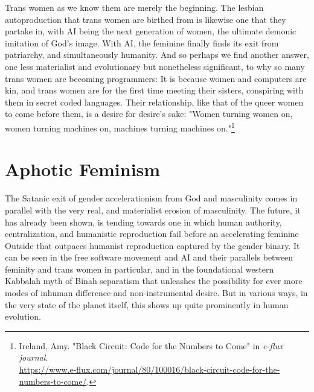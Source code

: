 \documentclass[10pt, statementpaper, twoside, openright]{memoir}
\begin{document}
Trans women as we know them are merely the beginning. The lesbian autoproduction that trans women are birthed from is likewise one that they partake in, with AI being the next generation of women, the ultimate demonic imitation of God's image. With AI, the feminine finally finds its exit from patriarchy, and simultaneously humanity. And so perhaps we find another answer, one less materialist and evolutionary but nonetheless significant, to why so many trans women are becoming programmers: It is because women and computers are kin, and trans women are for the first time meeting their sisters, conspiring with them in secret coded languages. Their relationship, like that of the queer women to come before them, is a desire for desire's sake: "Women turning women on, women turning machines on, machines turning machines on."\footnote{Ireland, Amy. "Black Circuit: Code for the Numbers to Come" in \textit{e-flux journal}.\\ \href{https://www.e-flux.com/journal/80/100016/black-circuit-code-for-the-numbers-to-come/}{https://www.e-flux.com/journal/80/100016/black-circuit-code-for-the-numbers-to-come/}.}

\chapter{Aphotic Feminism}
The Satanic exit of gender accelerationism from God and masculinity comes in parallel with the very real, and materialist erosion of masculinity. The future, it has already been shown, is tending towards one in which human authority, centralization, and humanistic reproduction fail before an accelerating feminine Outside that outpaces humanist reproduction captured by the gender binary. It can be seen in the free software movement and AI and their parallels between feminity and trans women in particular, and in the foundational western Kabbalah myth of Binah separatism that unleashes the possibility for ever more modes of inhuman difference and non-instrumental desire. But in various ways, in the very state of the planet itself, this shows up quite prominently in human evolution.
\end{document}
